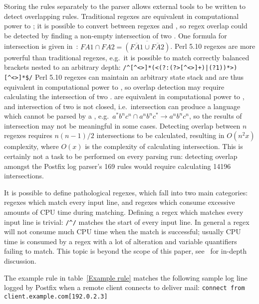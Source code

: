 \documentclass[draft]{svmult}
\newcommand{\refwithlabel}[2]{%
    #1~\vref{#2}%
}
\newcommand{\tableref}[1]{%
    \refwithlabel{table}{#1}%
}
\newcommand{\tab}[0]{%
    \hspace*{2em}%
}
\newcommand{\numberOFrules}[0]{%
    169%
}
\newcommand{\numberOFruleINTERSECTIONS}[0]{%
    14196%
}
\begin{document}
Storing the rules separately to the parser allows external tools to be
written to detect overlapping rules.  Traditional regexes are equivalent in
computational power to \FA{}; it is possible to convert between regexes and
\FA{}, so regex overlap could be detected by finding a non-empty
intersection of two \FA{}\@.  One formula for \FA{} intersection is given
in~\cite{intersection-of-NFA-using-Z}: $FA1 \cap{} FA2 =
\overline{(\overline{FA1} \cup{} \overline{FA2})}$.  Perl 5.10 regexes are
more powerful than traditional regexes, e.g.\ it is possible to match
correctly balanced brackets nested to an arbitrary depth:
\newline{}\tab{}\verb!/^[^<>]*(<(?:(?>[^<>]+)|(?1))*>)[^<>]*$/!\newline{}
Perl 5.10 regexes can maintain an arbitrary state stack and are thus
equivalent in computational power to \PDA{}, so overlap detection may
require calculating the intersection of two \PDA{}\@.  \CFL{} are
equivalent in computational power to \PDA{}, and intersection of two
 is not closed, i.e.\ intersection can produce a language which
cannot be parsed by a \CFL{}, e.g.\ $a^{*}b^{n}c^{n} \cap a^{n}b^{n}c^{*}
\rightarrow a^{n}b^{n}c^{n}$, so the results of \PDA{} intersection may not
be meaningful in some cases.  Detecting overlap between $n$ regexes
requires $n(n-1)/2$ intersections to be calculated, resulting in $O(n^2x)$
complexity, where $O(x)$ is the complexity of calculating intersection.
This is certainly not a task to be performed on every parsing run:
detecting overlap amongst the Postfix log parser's \numberOFrules{} rules
would require calculating \numberOFruleINTERSECTIONS{} intersections.

It is possible to define pathological regexes, which fall into two main
categories: regexes which match every input line, and regexes which consume
excessive amounts of CPU time during matching.  Defining a regex which
matches every input line is trivial: \verb!/^/! matches the start of every
input line.  In general a regex will not consume much CPU time when the
match is successful; usually CPU time is consumed by a regex with a lot of
alteration and variable quantifiers failing to match.  This topic is beyond
the scope of this paper, see~\cite{mastering-regular-expressions} for
in-depth discussion.

The example rule in \tableref{Example rule} matches the following sample
log line logged by Postfix when a remote client connects to deliver mail:
\newline{}\tab{}\verb!connect from client.example.com[192.0.2.3]!
\end{document}
